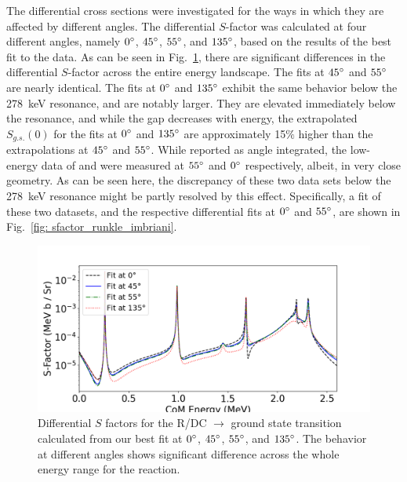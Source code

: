 The differential cross sections were investigated for the ways in which they are affected by different angles. The differential $S$-factor was calculated at four different angles, namely $0\degree$, $45\degree$, $55\degree$, and $135\degree$, based on the results of the best fit to the data. As can be seen in Fig.~\ref{fig: sfactor_differential_angles}, there are significant differences in the differential $S$-factor across the entire energy landscape. The fits at $45\degree$ and $55\degree$ are nearly identical. The fits at $0\degree$ and $135\degree$ exhibit the same behavior below the 278~keV resonance, and are notably larger. They are elevated immediately below the resonance, and while the gap decreases with energy, the extrapolated $S_{g.s.}(0)$ for the fits at $0\degree$ and $135\degree$ are approximately 15$\%$ higher than the extrapolations at $45\degree$ and $55\degree$. While reported as angle integrated, the low-energy data of \citet{Imbriani2005} and \citet{Runkle2005} were measured at $55\degree$ and $0\degree$ respectively, albeit, in very close geometry. As can be seen here, the discrepancy of these two data sets below the 278~keV resonance might be partly resolved by this effect. Specifically, a fit of these two datasets, and the respective differential fits at $0\degree$ and $55\degree$, are shown in Fig.~\ref{fig: sfactor_runkle_imbriani}. 


\begin{figure}
\centering
\includegraphics[width=1.0\columnwidth]{./figures/differential_fits.png}
\caption{Differential $S$ factors for the R/DC $\rightarrow$ ground state transition calculated from our best fit at $0\degree$, $45\degree$, $55\degree$, and $135\degree$. The behavior at different angles shows significant difference across the whole energy range for the reaction. }
\label{fig: sfactor_differential_angles}
\end{figure}

